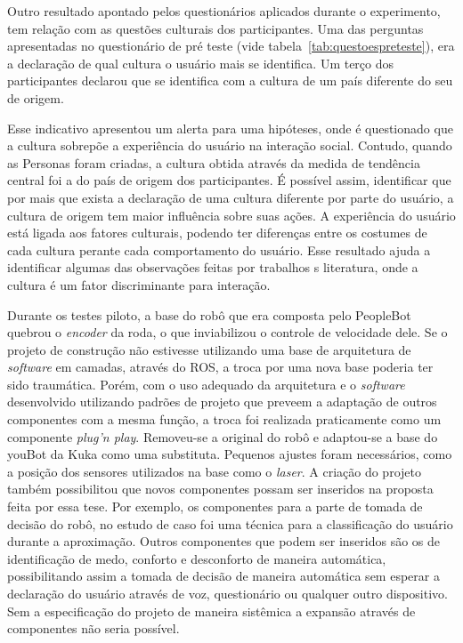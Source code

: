 Outro resultado apontado pelos questionários aplicados durante o experimento, tem relação com as questões culturais dos participantes. Uma das perguntas apresentadas no questionário de pré teste (vide tabela~\ref{tab:questoespreteste}), era a declaração de qual cultura o usuário mais se identifica. Um terço dos participantes declarou que se identifica com a cultura de um país diferente do seu de origem.

Esse indicativo apresentou um alerta para uma  hipóteses, onde é questionado que a cultura sobrepõe a experiência do usuário na interação social. Contudo, quando as Personas foram criadas, a cultura obtida através da medida de tendência central foi a do país de origem dos participantes. É possível assim, identificar que por mais que exista a declaração de uma cultura diferente por parte do usuário, a cultura de origem tem maior influência sobre suas ações. A experiência do usuário está ligada aos fatores culturais, podendo ter diferenças entre os costumes de cada cultura perante cada comportamento do usuário. Esse resultado ajuda a identificar algumas das observações feitas por trabalhos  s literatura, onde a cultura é um fator discriminante para interação.

Durante os testes piloto, a base do robô que era composta pelo PeopleBot quebrou o \textit{encoder} da roda, o que inviabilizou o controle de velocidade dele. Se o projeto de construção não estivesse utilizando uma base de arquitetura de \textit{software} em camadas, através do ROS, a troca por uma nova base poderia ter sido traumática. Porém, com o uso adequado da arquitetura e o \textit{software} desenvolvido utilizando padrões de projeto que preveem a adaptação de outros componentes com a mesma função, a troca foi realizada praticamente como um componente \emph{plug'n play}. Removeu-se a original do robô e adaptou-se a base do youBot da Kuka como uma substituta. Pequenos ajustes foram necessários, como a posição dos sensores utilizados na base como o \emph{laser}. A criação do projeto também possibilitou que novos componentes possam ser inseridos na proposta feita por essa tese. Por exemplo, os componentes para a parte de tomada de decisão do robô, no estudo de caso foi uma técnica para a classificação do usuário durante a aproximação. Outros componentes que podem ser inseridos são os de identificação de medo, conforto e desconforto de maneira automática, possibilitando assim a tomada de decisão de maneira automática sem esperar a declaração do usuário através de voz, questionário ou qualquer outro dispositivo. Sem a especificação do projeto de maneira sistêmica a expansão através de componentes não seria possível.

